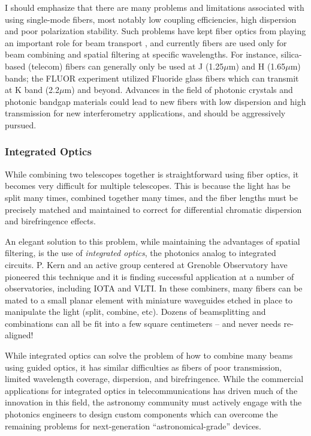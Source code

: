 \documentclass[12pt]{article}
\begin{document}
I should emphasize that there are many problems and limitations
associated with using single-mode fibers, most notably low coupling
efficiencies, high dispersion and poor polarization stability.  Such
problems have kept fiber optics from playing an important role for
beam transport \citep{simohamed1997}, and currently fibers are used
only for beam combining and spatial filtering at specific wavelengths.
For instance, silica-based (telecom) fibers can generally only be used
at J (1.25$\mu$m) and H (1.65$\mu$m) bands; the FLUOR experiment
utilized Fluoride glass fibers which can transmit at K band
(2.2$\mu$m) and beyond.  Advances in the field of
photonic crystals and photonic bandgap materials could lead to new
fibers with low dispersion and high transmission for new
interferometry applications, and should be aggressively pursued.

\subsubsection{Integrated Optics}
While combining two telescopes together is straightforward using fiber
optics, it becomes very difficult for multiple telescopes. This is
because the light has be split many times, combined together many
times, and the fiber lengths must be precisely matched and maintained
to correct for differential chromatic dispersion and birefringence
effects.

An elegant solution to this problem, while maintaining the advantages
of spatial filtering, is the use of {\em integrated optics}, the
photonics analog to integrated circuits.  P. Kern and an active group
centered at Grenoble Observatory have pioneered this technique
\citep[e.g.,][]{kern1997,malbet1999, berger1999} and it is finding
successful application at a number of observatories, including IOTA
\citep{berger2001} and VLTI. In these combiners, many fibers can be
mated to a small planar element with miniature waveguides etched
in place to manipulate the light (split, combine, etc).  Dozens of
beamsplitting and combinations can all be fit into a few square
centimeters -- and never needs re-aligned!

While integrated optics can solve the problem of how to combine many
beams using guided optics, it has similar difficulties as fibers of
poor transmission, limited wavelength coverage, dispersion, and
birefringence.  While the commercial applications for integrated
optics in telecommunications has driven much of the innovation in this
field, the astronomy community must actively engage with the photonics
engineers to design custom components which can overcome the remaining
problems for next-generation ``astronomical-grade'' devices.
\end{document}
